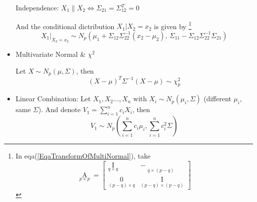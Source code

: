 \begin{itemize}[topsep=6pt,itemsep=4pt]
        Independence: $ X_1\parallel X_2\Leftrightarrow \Sigma _{21}=\Sigma _{12}^T=0  $

        And the conditional dictribution $ X_1|X_2=x_2 $ is given by \footnote{In eqa(\ref{EqaTransformOfMultiNormal}), take 
        \[
            \mathop{A}\limits_{p\times p}=\begin{bmatrix}
                \mathop{I}\limits_{q\times q} & -\mathop{\Sigma _{12}\Sigma _{22}^{-1}}\limits_{q\times (p-q)} \\
                \mathop{0}\limits_{(p-q)\times q}&\mathop{I}\limits_{(p-q)\times (p-q)}  
            \end{bmatrix}  
        \]
        
        }
        \begin{equation}
            X_1|_{X_2=x_2}\sim N_p(\mu_1+\Sigma _{12}\Sigma _{22}^{-1}(x_2-\mu_2),\,\Sigma _{11}-\Sigma _{12}\Sigma _{22}^{-1}\Sigma _{21})
        \end{equation}

        \item Multivariate Normal \& $ \chi^2 $
        
         Let $ X\sim N_p(\mu,\Sigma ) $, then 
         \begin{equation}
             (X-\mu)^T\Sigma ^{-1}(X-\mu)\sim \chi_p^2 
         \end{equation}
         
         \item Linear Combination:
        Let $ X_1,X_2\ldots,X_n $ with $ X_i\sim N_p(\mu_i,\Sigma ) $ (different $ \mu_i $, same $ \Sigma  $). And denote $ V_1=\sum_{i=1}^nc_iX_i $, then
        \begin{equation}
            V_1\sim N_p(\sum_{i=1}^n c_i\mu_i,\sum_{i=1}^nc_i^2\Sigma ) 
        \end{equation}
        
        
        
        
        
        
    \end{itemize}
    
        







